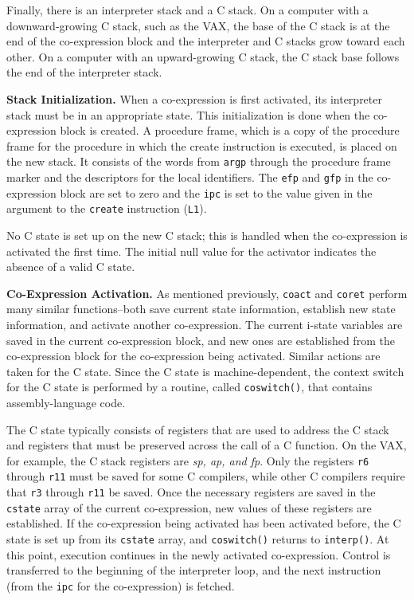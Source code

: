 Finally, there is an interpreter stack and a C stack. On a computer
with a downward-growing C stack, such as the VAX, the base of the C
stack is at the end of the co-expression block and the interpreter and
C stacks grow toward each other. On a computer with an upward-growing
C stack, the C stack base follows the end of the interpreter stack.

\textbf{Stack Initialization.} When a co-expression is first
activated, its interpreter stack must be in an appropriate state. This
initialization is done when the co-expression block is created. A
procedure frame, which is a copy of the procedure frame for the
procedure in which the create instruction is executed, is placed on
the new stack. It consists of the words from \texttt{argp} through the
procedure frame marker and the descriptors for the local
identifiers. The \texttt{efp} and \texttt{gfp} in the co-expression
block are set to zero and the \texttt{ipc} is set to the value given
in the argument to the \texttt{create} instruction (\texttt{L1}).

No C state is set up on the new C stack; this is handled when the co-expression is activated the first time. The initial
null value for the activator indicates the absence of a valid C state.


\textbf{Co-Expression Activation.} As mentioned previously,
\texttt{coact} and \texttt{coret} perform many similar functions--both
save current state information, establish new state information, and
activate another co-expression.  The current i-state variables are
saved in the current co-expression block, and new ones are established
from the co-expression block for the co-expression being
activated. Similar actions are taken for the C state. Since the C
state is machine-dependent, the {\textquotedbl}context
switch{\textquotedbl} for the C state is performed by a routine,
called \texttt{coswitch()}, that contains assembly-language code.

The C state typically consists of registers that are used to address
the C stack and registers that must be preserved across the call of a
C function. On the VAX, for example, the C stack registers are
\textit{sp, ap, and fp}. Only the registers \texttt{r6} through
\texttt{r11} must be saved for some C compilers, while other C
compilers require that \texttt{r3} through \texttt{r11} be saved. Once
the necessary registers are saved in the \texttt{cstate} array of the
current co-expression, new values of these registers are
established. If the co-expression being activated has been activated
before, the C state is set up from its \texttt{cstate} array, and
\texttt{coswitch()} returns to \texttt{interp()}. At this point,
execution continues in the newly activated co-expression. Control is
transferred to the beginning of the interpreter loop, and the next
instruction (from the \texttt{ipc} for the co-expression) is fetched.


